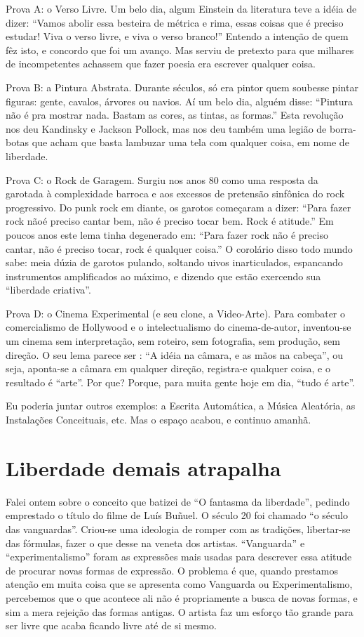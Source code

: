 Prova A: o Verso Livre. Um belo dia, algum Einstein da literatura teve
a idéia de dizer: “Vamos abolir essa besteira de métrica e rima,
essas coisas que é preciso estudar! Viva o verso livre, e viva o
verso branco!”  Entendo a intenção de quem fêz isto, e concordo que
foi um avanço. Mas serviu de pretexto para que milhares de
incompetentes achassem que fazer poesia era escrever qualquer coisa.

Prova B: a Pintura Abstrata. Durante séculos, só era pintor quem
soubesse pintar figuras: gente, cavalos, árvores ou navios. Aí um
belo dia, alguém disse: “Pintura não é pra mostrar nada. Bastam as
cores, as tintas, as formas.” Esta revolução nos deu Kandinsky e
Jackson Pollock, mas nos deu também uma legião de borra-botas que
acham que basta lambuzar uma tela com qualquer coisa, em nome de
liberdade.

Prova C: o Rock de Garagem. Surgiu nos anos 80 como uma resposta da
garotada à complexidade barroca e aos excessos de pretensão sinfônica
do rock progressivo. Do punk rock em diante, os garotos começaram a
dizer: “Para fazer rock nãoé preciso cantar bem, não é preciso tocar
bem. Rock é atitude.” Em poucos anos este lema tinha degenerado em:
“Para fazer rock não é preciso cantar, não é preciso tocar, rock é
qualquer coisa.”  O corolário disso todo mundo sabe: meia dúzia de
garotos pulando, soltando uivos inarticulados, espancando
instrumentos amplificados ao máximo, e dizendo que estão exercendo
sua “liberdade criativa”.

Prova D: o Cinema Experimental (e seu clone, a Video-Arte). Para
combater o comercialismo de Hollywood e o intelectualismo do
cinema-de-autor, inventou-se um cinema sem interpretação, sem
roteiro, sem fotografia, sem produção, sem direção. O seu lema parece
ser : “A idéia na câmara, e as mãos na cabeça”, ou seja, aponta-se a
câmara em qualquer direção, registra-e qualquer coisa, e o resultado
é “arte”. Por que? Porque, para muita gente hoje em dia, “tudo é
arte”.

Eu poderia juntar outros exemplos: a Escrita Automática, a Música
Aleatória, as Instalações Conceituais, etc. Mas o espaço acabou, e
continuo amanhã.

\chapter{Liberdade demais atrapalha}

Falei ontem sobre o conceito que batizei de “O fantasma da liberdade”,
pedindo emprestado o título do filme de Luís Buñuel. O século 20 foi
chamado “o século das vanguardas”. Criou-se uma ideologia de romper
com as tradições, libertar-se das fórmulas, fazer o que desse na
veneta dos artistas. “Vanguarda” e “experimentalismo” foram as
expressões mais usadas para descrever essa atitude de procurar novas
formas de expressão.  O problema é que, quando prestamos atenção em
muita coisa que se apresenta como Vanguarda ou Experimentalismo,
percebemos que o que acontece ali não é propriamente a busca de novas
formas, e sim a mera rejeição das formas antigas. O artista faz um
esforço tão grande para ser livre que acaba ficando livre até de si
mesmo.

